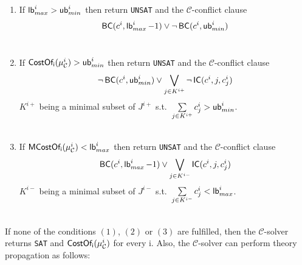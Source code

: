 \documentclass{amsart}
\theoremstyle{definition}
\theoremstyle{remark}
\numberwithin{equation}{section}
\def\C{$\mathcal{C}$}
\def\sat{\texttt{SAT}}
\def\unsat{\texttt{UNSAT}}
\begin{document}
    \begin{enumerate}
      \item If $\operatorname{\sf lb \rm}_{max}^i > \operatorname{\sf ub \rm}_{min}^i$ then return \unsat{} and the \C{}-conflict clause
      \begin{equation*}
        \operatorname{\sf BC \rm}(c^i, \operatorname{\sf lb \rm}_{max}^i - 1) \vee \neg \operatorname{\sf BC \rm}(c^i, \operatorname{\sf ub \rm}_{min}^i)
      \end{equation*} \\

      \item If $\operatorname{\sf CostOf_i \rm}(\mu_{\mathcal{C}}^i) > \operatorname{\sf ub \rm}_{min}^i$ then return \unsat{} and the \C{}-conflict clause
      \begin{equation*}
        \neg \operatorname{\sf BC \rm}(c^i, \operatorname{\sf ub \rm}_{min}^i) \vee \bigvee\limits_{j \in K^{i+}} \neg \operatorname{\sf IC \rm}(c^i, j, c^i_j)
      \end{equation*}
      $K^{i+}$ being a minimal subset of $J^{i+}$ s.t.\ $\sum\limits_{j \in K^{i+}} c^i_j > \operatorname{\sf ub \rm}_{min}^i$. \\\\

      \item If $\operatorname{\sf MCostOf_i \rm}(\mu_{\mathcal{C}}^i) < \operatorname{\sf lb \rm}_{max}^i$ then return \unsat{} and the \C{}-conflict clause
      \begin{equation*}
        \operatorname{\sf BC \rm}(c^i, \operatorname{\sf lb \rm}_{max}^i - 1) \vee \bigvee\limits_{j \in K^{i-}} \operatorname{\sf IC \rm}(c^i, j, c^i_j)
      \end{equation*}
      $K^{i-}$ being a minimal subset of $J^{i-}$ s.t.\ $\sum\limits_{j \in K^{i-}} c^i_j < \operatorname{\sf lb \rm}_{max}^i$. \\\\

    \end{enumerate}
    If none of the conditions $(1)$, $(2)$ or $(3)$ are fulfilled, then the \C{}-solver returns \sat{} and $\operatorname{\sf CostOf_i \rm}(\mu_{\mathcal{C}}^i)$ for every i. Also, the \C{}-solver can perform theory propagation as follows:
\end{document}
